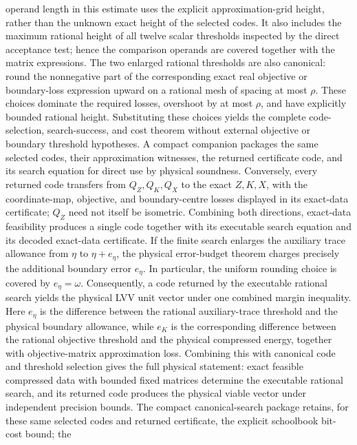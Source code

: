 \begin{lemma}
    operand length in this estimate uses the explicit approximation-grid height,
    rather than the unknown exact height of the selected codes.  It also includes
    the maximum rational height of all twelve scalar thresholds inspected by the
    direct acceptance test; hence the comparison operands are covered together
    with the matrix expressions.
    The two enlarged rational thresholds are also canonical: round the
    nonnegative part of the corresponding exact real objective or boundary-loss
    expression upward on a rational mesh of spacing at most $\rho$.  These
    choices dominate the required losses, overshoot by at most $\rho$, and have
    explicitly bounded rational height.  Substituting
    these choices yields the complete code-selection, search-success, and cost
    theorem without external objective or boundary threshold hypotheses.
    A compact companion packages the same selected codes, their approximation
    witnesses, the returned certificate code, and its search equation for direct
    use by physical soundness.
    Conversely, every returned code transfers from $Q_Z,Q_K,Q_X$ to the exact
    $Z,K,X$, with the coordinate-map, objective, and boundary-centre losses
    displayed in its exact-data certificate; $Q_Z$ need not itself be isometric.
    Combining both directions, exact-data feasibility produces a single code
    together with its executable search equation and its decoded exact-data
    certificate.
    If the finite search enlarges the auxiliary trace allowance from $\eta$ to
    $\eta+e_\eta$, the physical error-budget theorem charges precisely the
    additional boundary error $e_\eta$.  In particular, the uniform rounding
    choice is covered by $e_\eta=\omega$.
    Consequently, a code returned by the executable rational search yields the
    physical LVV unit vector under one combined margin inequality.  Here
    $e_\eta$ is the difference between the rational auxiliary-trace threshold
    and the physical boundary allowance, while $e_K$ is the corresponding
    difference between the rational objective threshold and the physical
    compressed energy, together with objective-matrix approximation loss.
    Combining this with canonical code and threshold selection gives the full
    physical statement: exact feasible compressed data with bounded fixed
    matrices determine the executable rational search, and its returned code
    produces the physical viable vector under independent precision bounds.
    The compact canonical-search package retains, for these same selected codes
    and returned certificate, the explicit schoolbook bit-cost bound; the

\end{lemma}
